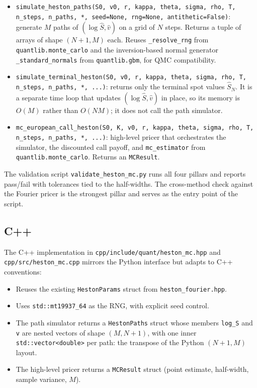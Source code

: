 \documentclass[11pt]{article}
\theoremstyle{plain}
\theoremstyle{definition}
\theoremstyle{remark}
\begin{document}
\begin{itemize}[topsep=2pt]
    \item \texttt{simulate\_heston\_paths(S0, v0, r, kappa, theta, sigma, rho, T, n\_steps, n\_paths, *, seed=None, rng=None, antithetic=False)}: generate $M$ paths of $(\log \hat S, \hat v)$ on a grid of $N$ steps. Returns a tuple of arrays of shape $(N+1, M)$ each. Reuses \texttt{\_resolve\_rng} from \texttt{quantlib.monte\_carlo} and the inversion-based normal generator \texttt{\_standard\_normals} from \texttt{quantlib.gbm}, for QMC compatibility.
    \item \texttt{simulate\_terminal\_heston(S0, v0, r, kappa, theta, sigma, rho, T, n\_steps, n\_paths, *, ...)}: returns only the terminal spot values $\hat S_N$. It is a separate time loop that updates $(\log \hat S, \hat v)$ in place, so its memory is $O(M)$ rather than $O(NM)$; it does not call the path simulator.
    \item \texttt{mc\_european\_call\_heston(S0, K, v0, r, kappa, theta, sigma, rho, T, n\_steps, n\_paths, *, ...)}: high-level pricer that orchestrates the simulator, the discounted call payoff, and \texttt{mc\_estimator} from \texttt{quantlib.monte\_carlo}. Returns an \texttt{MCResult}.
\end{itemize}

The validation script \texttt{validate\_heston\_mc.py} runs all four pillars and reports pass/fail with tolerances tied to the half-widths. The cross-method check against the Fourier pricer is the strongest pillar and serves as the entry point of the script.

\subsection{C++}

The C++ implementation in \texttt{cpp/include/quant/heston\_mc.hpp} and \texttt{cpp/src/heston\_mc.cpp} mirrors the Python interface but adapts to C++ conventions:
\begin{itemize}[topsep=2pt]
    \item Reuses the existing \texttt{HestonParams} struct from \texttt{heston\_fourier.hpp}.
    \item Uses \texttt{std::mt19937\_64} as the RNG, with explicit seed control.
    \item The path simulator returns a \texttt{HestonPaths} struct whose members \texttt{log\_S} and \texttt{v} are nested vectors of shape $(M, N+1)$, with one inner \texttt{std::vector<double>} per path: the transpose of the Python $(N+1, M)$ layout.
    \item The high-level pricer returns a \texttt{MCResult} struct (point estimate, half-width, sample variance, $M$).
\end{itemize}
\end{document}
